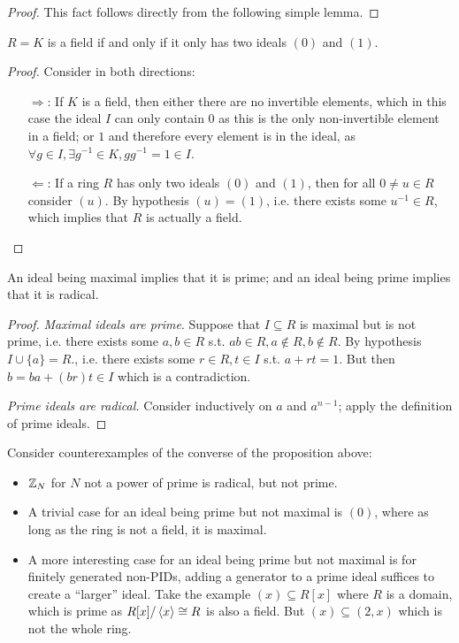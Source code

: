 \documentclass{article}
\begin{document}
\begin{proof}
    This fact follows directly from the following simple lemma.
\end{proof}

\begin{lemma}
    $R = K$ is a field if and only if it only has two ideals $(0)$ and $(1)$.
\end{lemma}

\begin{proof}
    Consider in both directions:
    \begin{itemize}
        \item[$\Rightarrow$:] If $K$ is a field, then either there are no invertible elements, which in this case the ideal $I$ can only contain 0 as this is the only non-invertible element in a field; or $1$ and therefore every element is in the ideal, as $\forall g\in I, \exists g^{-1} \in K, gg^{-1} = 1 \in I$.
        \item[$\Leftarrow$:] If a ring $R$ has only two ideals $(0)$ and $(1)$, then for all $0\neq u\in R$ consider $(u)$. By hypothesis $(u) = (1)$, i.e. there exists some $u^{-1}\in R$, which implies that $R$ is actually a field.
    \end{itemize} 
\end{proof}

\begin{proposition}
    An ideal being maximal implies that it is prime; and an ideal being prime implies that it is radical. 
\end{proposition}

\begin{proof} 
   \emph{Maximal ideals are prime}. Suppose that $I \subseteq R$ is maximal but is not prime, i.e. there exists some $a, b\in R$ s.t. $ab\in R, a\notin R, b\notin R$. By hypothesis $I \cup \{a\} = R$., i.e. there exists some $r\in R, t\in I$ s.t. $a + rt = 1$. But then $b = ba + (br)t \in I$ which is a contradiction.

   \emph{Prime ideals are radical.} Consider inductively on $a$ and $a^{n-1}$; apply the definition of prime ideals.
\end{proof}

\begin{example}
    Consider counterexamples of the converse of the proposition above:
    \begin{itemize}
        \item $\mathbb{Z}_N$ for $N$ not a power of prime is radical, but not prime.
        \item A trivial case for an ideal being prime but not maximal is $(0)$, where as long as the ring is not a field, it is maximal.
        \item A more interesting case for an ideal being prime but not maximal is for finitely generated non-PIDs, adding a generator to a prime ideal suffices to create a ``larger'' ideal. Take the example $(x) \subseteq R[x]$ where $R$ is a domain, which is prime as $R[x]/\left\langle x \right\rangle \cong R$ is also a field. But $(x) \subseteq (2, x)$ which is not the whole ring.
    \end{itemize}
\end{example}
\end{document}
